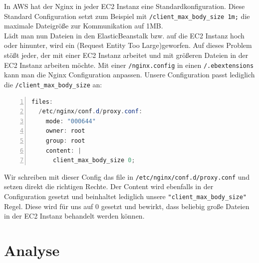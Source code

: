 \documentclass[a4paper, 12pt]{scrreprt}
\renewcommand\_{\textunderscore\allowbreak}
\begin{document}
In AWS hat der Nginx in jeder EC2 Instanz eine Standardkonfiguration. Diese Standard Configuration setzt zum Beispiel mit \lstinline|/client_max_body_size 1m;| \cite{NGINX} die maximale Dateigröße zur Kommunikation auf 1MB.\\
Lädt man nun Dateien in den ElasticBeanstalk bzw. auf die EC2 Instanz hoch oder hinunter, wird ein  (Request Entity Too Large)\grqq geworfen. Auf dieses Problem stößt jeder, der mit einer EC2 Instanz arbeitet und mit größeren Dateien in der EC2 Instanz arbeiten möchte.
Mit einer \lstinline|/nginx.config| in einen \lstinline|/.ebextensions| kann man die Nginx Configuration anpassen. 
Unsere Configuration passt lediglich die \lstinline|/client_max_body_size| an:\\
\begin{lstlisting}[xleftmargin=\parindent,numbers=left,numberstyle=\small,numbersep=8pt,frame=L,mathescape=true, basicstyle=\small, language=Java, lineskip={1.0pt}]
files:
  /etc/nginx/conf.d/proxy.conf:
    mode: "000644"
    owner: root
    group: root
    content: |
      client_max_body_size 0;
\end{lstlisting}
\bigskip
\noindent Wir schreiben mit dieser Config das file in \lstinline|/etc/nginx/conf.d/proxy.conf| und setzen direkt die richtigen Rechte. Der Content wird ebenfalls in der Configuration gesetzt und beinhaltet lediglich unsere \lstinline|"client_max_body_size"|  Regel. Diese wird für uns auf 0 gesetzt und bewirkt, dass beliebig große Dateien in der EC2 Instanz behandelt werden können.



\chapter{Analyse}
\end{document}
